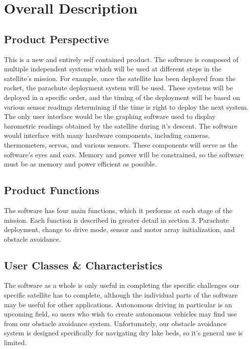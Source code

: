 \documentclass[10pt,onecolumn,draftclsnofoot,document]{IEEEtran}
\begin{document}



\section{Overall Description}
\subsection{Product Perspective}
This is a new and entirely self contained product. The software is composed of multiple independent systems which will be used at different steps in the satellite's mission. For example, once the satellite has been deployed from the rocket, the parachute deployment system will be used. These systems will be deployed in a specific order, and the timing of the deployment will be based on various sensor readings determining if the time is right to deploy the next system. The only user interface would be the graphing software used to display barometric readings obtained by the satellite during it's descent. The software would interface with many hardware components, including cameras, thermometers, servos, and various sensors. These components will serve as the software's eyes and ears. Memory and power will be constrained, so the software must be as memory and power efficient as possible.

\subsection{Product Functions}
The software has four main functions, which it performs at each stage of the mission. Each function is described in greater detail in section 3. Parachute deployment, change to drive mode, sensor and motor array initialization, and obstacle avoidance.

\subsection{User Classes \& Characteristics}
The software as a whole is only useful in completing the specific challenges our specific satellite has to complete, although the individual parts of the software may be useful for other applications. Autonomous driving in particular is an upcoming field, so users who wish to create autonomous vehicles may find use from our obstacle avoidance system. Unfortunately, our obstacle avoidance system is designed specifically for navigating dry lake beds, so it's general use is limited. 
\end{document}
